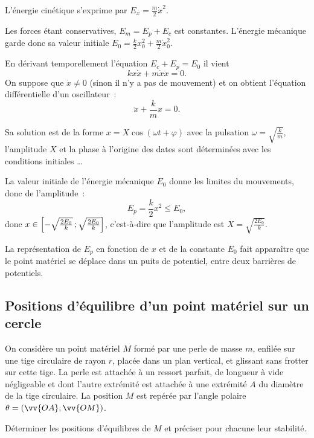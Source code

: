 L'énergie cinétique s'exprime par $E_x = \frac{m}{2} \dot{x}^2$.

Les forces étant conservatives, $E_m=E_p+E_c$ est constantes. L'énergie mécanique garde donc sa valeur initiale $E_0=\frac{k}{2}x_0^2 + \frac{m}{2}\dot{x}_0^2$.

En dérivant temporellement l'équation $E_c+E_p=E_0$ il vient
\begin{equation}
  k x \dot{x} +m \dot{x}\ddot{x} =0.
\end{equation}
On suppose que $\dot{x} \neq 0$ (sinon il n'y a pas de mouvement) et on obtient l'équation différentielle d'un oscillateur~:
\begin{equation}
  \ddot{x} + \frac{k}{m}x=0.
\end{equation}

Sa solution est de la forme $x=X\cos(\omega t +\varphi)$ avec la pulsation $\omega = \sqrt{\frac{k}{m}}$, l'amplitude $X$ et la phase à l'origine des dates sont déterminées avec les conditions initiales \ldots

La valeur initiale de l'énergie mécanique $E_0$ donne les limites du mouvements, donc de l'amplitude~:
\begin{equation}
  E_p=\frac{k}{2}x^2 \leq E_0,
\end{equation}
donc $x \in \left[ -\sqrt{\frac{2E_0}{k}} \, ;  \sqrt{\frac{2E_0}{k}} \right]$, c'est-à-dire que l'amplitude est $X=\sqrt{\frac{2E_0}{k}}$.

La représentation de $E_p$ en fonction de $x$ et de la constante $E_0$ fait apparaître que le point matériel se déplace dans un puits de potentiel, entre deux barrières de potentiels.

\subsection{Positions d'équilibre d'un point matériel sur un cercle}
\label{chap4-subsec:positionsdequilibredunpointsuruncercle}

On considère un point matériel $M$ formé par une perle de masse $m$, enfilée sur une tige circulaire de rayon $r$, placée dans un plan vertical, et glissant sans frotter sur cette tige. La perle est attachée à un ressort parfait, de longueur à vide négligeable et dont l'autre extrémité est attachée à une extrémité $A$ du diamètre de la tige circulaire. La position $M$ est repérée par l'angle polaire $\theta = (\vv{OA}, \vv{OM})$. 

Déterminer les positions d'équilibres de $M$ et préciser pour chacune leur stabilité.

